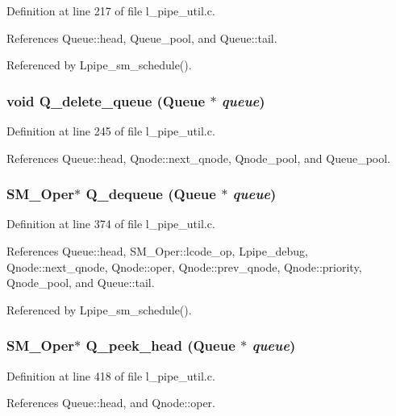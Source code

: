 Definition at line 217 of file l\_\-pipe\_\-util.c.

References Queue::head, Queue\_\-pool, and Queue::tail.

Referenced by Lpipe\_\-sm\_\-schedule().
\subsubsection{\setlength{\rightskip}{0pt plus 5cm}void Q\_\-delete\_\-queue (\bf{Queue} $\ast$ {\em queue})}\label{l__pipe__util_8c_942148e69d79ed6f032311fc5f673ec1}




Definition at line 245 of file l\_\-pipe\_\-util.c.

References Queue::head, Qnode::next\_\-qnode, Qnode\_\-pool, and Queue\_\-pool.
\subsubsection{\setlength{\rightskip}{0pt plus 5cm}\bf{SM\_\-Oper}$\ast$ Q\_\-dequeue (\bf{Queue} $\ast$ {\em queue})}\label{l__pipe__util_8c_133e3cf36bdcb5c8bd8a22cf3d73dc36}




Definition at line 374 of file l\_\-pipe\_\-util.c.

References Queue::head, SM\_\-Oper::lcode\_\-op, Lpipe\_\-debug, Qnode::next\_\-qnode, Qnode::oper, Qnode::prev\_\-qnode, Qnode::priority, Qnode\_\-pool, and Queue::tail.

Referenced by Lpipe\_\-sm\_\-schedule().
\subsubsection{\setlength{\rightskip}{0pt plus 5cm}\bf{SM\_\-Oper}$\ast$ Q\_\-peek\_\-head (\bf{Queue} $\ast$ {\em queue})}\label{l__pipe__util_8c_c31c6a79d7e89f946aa510fb48beeb21}




Definition at line 418 of file l\_\-pipe\_\-util.c.

References Queue::head, and Qnode::oper.
